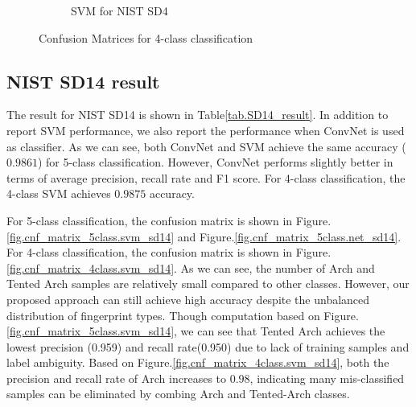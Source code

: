 \begin{figure}[!ht]
\begin{subfigure}[b]{0.25\textwidth}
		\caption{SVM for NIST SD4}
		\label{fig.cnf_matrix_4class.svm_sd4}
	\end{subfigure}%

	\caption{Confusion Matrices for 4-class classification}\label{fig.cnf_matrix_4class}
\end{figure}

\subsection{NIST SD14 result}
The result for NIST SD14 is shown in Table\ref{tab.SD14_result}.
%
In addition to report SVM performance, we also report the performance when ConvNet is used as classifier. 
%
As we can see, both ConvNet and SVM achieve the same accuracy ($0.9861$) for 5-class classification. 
%
However, ConvNet performs slightly better in terms of average precision, recall rate and F1 score.
%
For 4-class classification, the 4-class SVM achieves $0.9875$ accuracy.

For 5-class classification, the confusion matrix is shown in Figure.\ref{fig.cnf_matrix_5class.svm_sd14} and Figure.\ref{fig.cnf_matrix_5class.net_sd14}.
For 4-class classification, the confusion matrix is shown in Figure.\ref{fig.cnf_matrix_4class.svm_sd14}. 
%
As we can see, the number of Arch and Tented Arch samples are relatively small compared to other classes.
%
However, our proposed approach can still achieve high accuracy despite the unbalanced distribution of fingerprint types.
%
Though computation based on Figure.\ref{fig.cnf_matrix_5class.svm_sd14}, we can see that Tented Arch achieves the lowest precision (0.959) and recall rate(0.950) due to lack of training samples and label ambiguity. 
%
Based on Figure.\ref{fig.cnf_matrix_4class.svm_sd14}, both the precision and recall rate of Arch increases to $0.98$, indicating many mis-classified samples can be eliminated by combing Arch and Tented-Arch classes.


